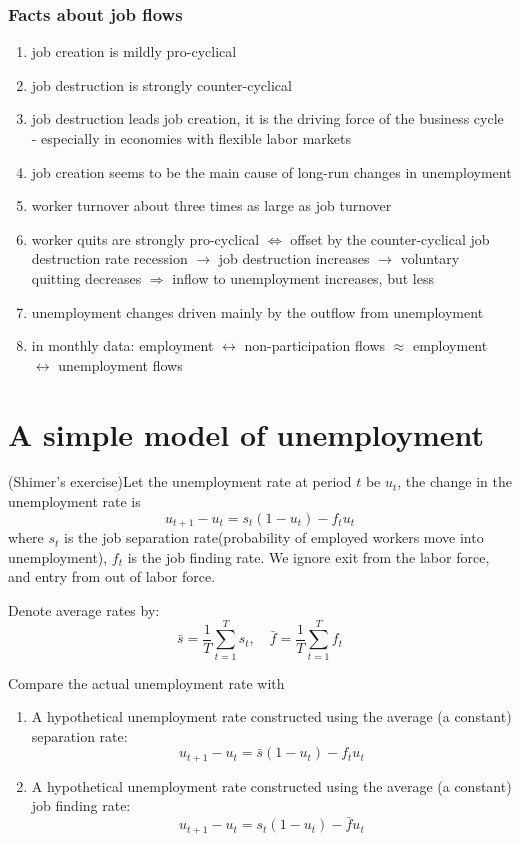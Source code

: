\subsubsection{Facts about job flows}

\begin{enumerate}
    \item job creation is mildly pro-cyclical
    \item job destruction is strongly counter-cyclical
    \item job destruction leads job creation,
    it is the driving force of the business cycle - especially in
    economies with ﬂexible labor markets
    \item job creation seems to be the main cause of long-run changes
    in unemployment
    \item worker turnover about three times as large as job turnover
    \item worker quits are strongly pro-cyclical $\Leftrightarrow$
    oﬀset by the counter-cyclical job destruction rate recession
    $\rightarrow$ job destruction increases
    $\rightarrow$ voluntary quitting decreases
    $\Rightarrow$ inﬂow to unemployment increases, but less
    \item unemployment changes driven mainly by the outﬂow from
    unemployment
    \item in monthly data: employment $\leftrightarrow$ non-participation ﬂows
    $\approx$ employment $\leftrightarrow$ unemployment ﬂows
\end{enumerate}

\section{A simple model of unemployment}

(Shimer’s exercise)Let the unemployment rate at period $t$ be $u_t$,
the change in the unemployment rate is
\[u_{t+1} - u_t = s_t(1-u_t) - f_t u_t\]
where $s_t$ is the job separation rate(probability of employed workers move into unemployment), 
$f_t$ is the job finding rate.
We ignore exit from the labor force, and entry from out of labor
force.

Denote average rates by:
\[\bar{s} = \frac{1}{T}\sum_{t=1}^T s_t, \quad \bar{f} = \frac{1}{T} \sum_{t=1}^{T} f_t \]

Compare the actual unemployment rate with
\begin{enumerate}
    \item A hypothetical unemployment rate constructed using the
    average (a constant) separation rate:
    \[u_{t+1} - u_t = \bar{s}(1-u_t) - f_t u_t\]
    \item A hypothetical unemployment rate constructed using the
    average (a constant) job finding rate:
    \[u_{t+1} - u_t = s_t(1-u_t) - \bar{f} u_t\]
\end{enumerate}

